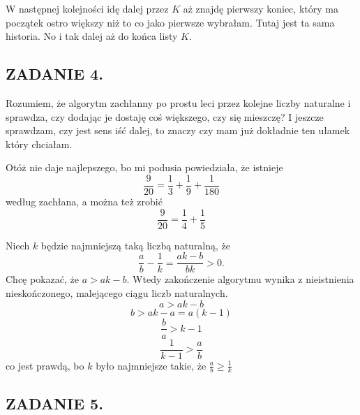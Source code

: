 \documentclass{article}
\begin{document}
W następnej kolejności idę dalej przez $K$ aż znajdę pierwszy koniec, który ma początek ostro większy niż to co jako pierwsze wybrałam. Tutaj jest ta sama historia. No i tak dalej aż do końca listy $K$.


\subsection*{ZADANIE 4.}

Rozumiem, że algorytm zachłanny po prostu leci przez kolejne liczby naturalne i sprawdza, czy dodając je dostaję coś większego, czy się mieszczę? I jeszcze sprawdzam, czy jest sens iść dalej, to znaczy czy mam już dokładnie ten ułamek który chciałam.


Otóż nie daje najlepszego, bo mi podusia powiedziała, że istnieje
$$\frac{9}{20}=\frac13+\frac19+\frac1{180}$$
według zachłana, a można też zrobić
$$\frac9{20}=\frac14+\frac15$$

Niech $k$ będzie najmniejszą taką liczbą naturalną, że
$$\frac{a}{b}-\frac1k=\frac{ak-b}{bk}>0.$$
Chcę pokazać, że $a>ak-b$. Wtedy zakończenie algorytmu wynika z nieistnienia nieskończonego, malejącego ciągu liczb naturalnych.
$$a>ak-b$$
$$b>ak-a=a(k-1)$$
$$\frac{b}{a}>k-1$$
$$\frac{1}{k-1}>\frac{a}{b}$$
co jest prawdą, bo $k$ było najmniejsze takie, że $\frac{a}{b}\geq\frac{1}{k}$



\subsection*{ZADANIE 5.}
\end{document}
